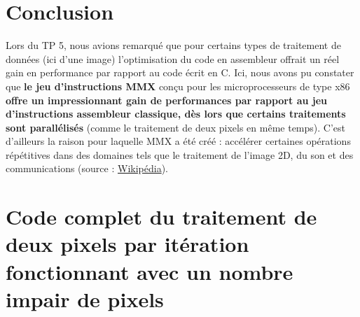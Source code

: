 \chapter{Conclusion}
Lors du TP 5, nous avions remarqué que pour certains types de traitement de données (ici d'une image) l'optimisation du code en assembleur offrait un réel gain en performance par rapport au code écrit en C. Ici, nous avons pu constater que \textbf{le jeu d'instructions MMX} conçu pour les microprocesseurs de type x86 \textbf{offre un impressionnant gain de performances par rapport au jeu d'instructions assembleur classique, dès lors que certains traitements sont parallélisés} (comme le traitement de deux pixels \og en même temps\fg{}). C'est d'ailleurs la raison pour laquelle MMX a été créé : accélérer certaines opérations répétitives dans des domaines tels que le traitement de l'image 2D, du son et des communications (source : \href{http://fr.wikipedia.org/wiki/MMX\_\%28jeu\_d\%27instructions\%29}{Wikipédia}).

\appendix
\chapter{Code complet du traitement de deux pixels par itération fonctionnant avec un nombre impair de pixels}

\lstset{inputencoding=latin1}
